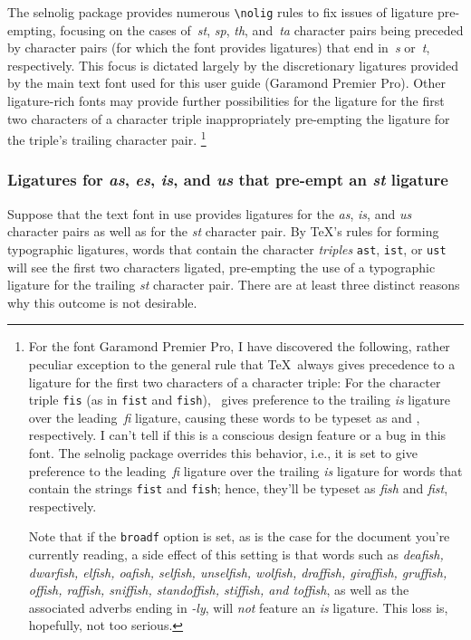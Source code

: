 \documentclass[11pt]{article}
\newcommand{\pkg}[1]{\textsf{#1}}
\newcommand{\opt}[1]{\texttt{#1}}
\newcommand{\cmmd}[1]{\texttt{\textbackslash #1}}
\begin{document}
\enlargethispage{0.5\baselineskip}

The \pkg{selnolig} package provides numerous \cmmd{nolig} rules to fix issues of ligature pre-empting, focusing on the cases of~\emph{st}, \emph{sp}, \emph{th}, and~\emph{ta} character pairs being preceded by character pairs (for which the font provides ligatures) that end in~\emph{s} or~\emph{t}, respectively. This focus is dictated largely by the discretionary ligatures provided by the main text font used for this user guide (Garamond Premier Pro). Other ligature-rich fonts may provide further possibilities for the ligature for the first two characters of a character triple inappropriately pre-empting the ligature for the triple's trailing character pair.%
\footnote{For the font Garamond Premier Pro, I have discovered the following, rather peculiar exception to the general rule that \TeX\ always gives precedence to a ligature for the first two characters of a character triple: For the character triple \opt{fis} (as in \opt{fist} and \opt{fish}), \LuaTeX\ gives preference to the trailing \emph{is} ligature over the leading\, \emph{fi} ligature, causing these words to be typeset as \emph{} and \emph{}, respectively. I can't tell if this is a conscious design feature or a bug in this font. The \pkg{selnolig} package overrides this behavior, i.e., it is set to give preference to the leading\, \emph{fi} ligature over the trailing \emph{is} ligature for words that contain the strings \opt{fist} and \opt{fish}; hence, they'll be typeset as \emph{fish} and \emph{fist}, respectively. 

Note that if the \opt{broadf} option is set, as is the case for the document you're currently reading, a side effect of this setting is that words such as \emph{deafish, dwarfish, elfish, oafish, selfish, unselfish, wolfish, draffish, giraffish, gruffish, offish, raffish, sniffish, standoffish, stiffish, \emph{and} toffish}, as well as the associated adverbs ending in \emph{-ly}, will \emph{not} feature an \emph{is} ligature. This loss is, hopefully, not too serious.}

\subsubsection*{Ligatures for \emph{as}, \emph{\ebg es},  \emph{is}, and \emph{us} that pre-empt an \emph{st} ligature}

Suppose that the text font in use provides ligatures for the \emph{as}, \emph{is}, and \emph{us} character pairs as well as for the \emph{st} character pair. By \TeX's rules for forming typographic ligatures, words that contain the character \emph{triples} \opt{ast}, \opt{ist}, or \opt{ust} will see the first two characters ligated, pre-empting the use of a typographic ligature for the trailing \emph{st} character pair. There are at least three distinct reasons why this outcome is not desirable.
\end{document}
